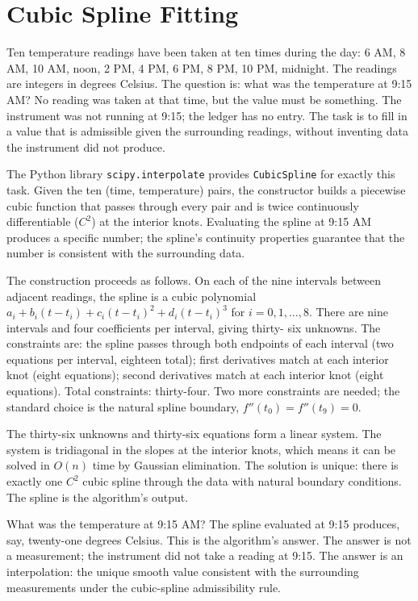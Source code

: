 \section{Cubic Spline Fitting}
\label{se:cubic-spline-fitting}

Ten temperature readings have been taken at ten times during the day: 6 AM,
8 AM, 10 AM, noon, 2 PM, 4 PM, 6 PM, 8 PM, 10 PM, midnight. The readings
are integers in degrees Celsius. The question is: what was the temperature
at 9:15 AM? No reading was taken at that time, but the value must be
something. The instrument was not running at 9:15; the ledger has no entry.
The task is to fill in a value that is admissible given the surrounding
readings, without inventing data the instrument did not produce.

The Python library \texttt{scipy.interpolate} provides
\texttt{CubicSpline} for exactly this task. Given the ten (time,
temperature) pairs, the constructor builds a piecewise cubic function that
passes through every pair and is twice continuously differentiable
($C^2$) at the interior knots. Evaluating the spline at 9:15 AM produces a
specific number; the spline's continuity properties guarantee that the
number is consistent with the surrounding data.

The construction proceeds as follows. On each of the nine intervals
between adjacent readings, the spline is a cubic polynomial $a_i + b_i
(t - t_i) + c_i (t - t_i)^2 + d_i (t - t_i)^3$ for $i = 0, 1, \ldots, 8$.
There are nine intervals and four coefficients per interval, giving thirty-
six unknowns. The constraints are: the spline passes through both
endpoints of each interval (two equations per interval, eighteen total);
first derivatives match at each interior knot (eight equations); second
derivatives match at each interior knot (eight equations). Total
constraints: thirty-four. Two more constraints are needed; the standard
choice is the natural spline boundary, $f''(t_0) = f''(t_9) = 0$.

The thirty-six unknowns and thirty-six equations form a linear system.
The system is tridiagonal in the slopes at the interior knots, which
means it can be solved in $O(n)$ time by Gaussian elimination. The
solution is unique: there is exactly one $C^2$ cubic spline through the
data with natural boundary conditions. The spline is the algorithm's
output.

What was the temperature at 9:15 AM? The spline evaluated at 9:15
produces, say, twenty-one degrees Celsius. This is the algorithm's
answer. The answer is not a measurement; the instrument did not take a
reading at 9:15. The answer is an interpolation: the unique smooth value
consistent with the surrounding measurements under the cubic-spline
admissibility rule.

